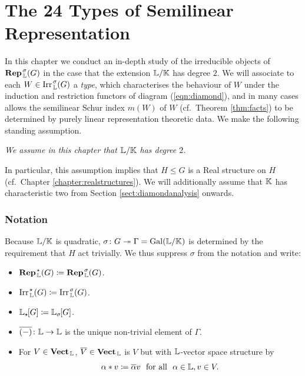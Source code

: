 \chapter{The 24 Types of Semilinear Representation}\label{chapter:twelvefoldway}

In this chapter we conduct an in-depth study of the irreducible objects of $\operatorname{\mathbf{Rep}}_{\, {\mathbb L}}^{\hspace{0.1em} \sigma}(G)$ in the case that the extension ${\mathbb L} / {\mathbb K}$ has degree $2$. We will associate to each $W \in \operatorname{Irr}_{\, {\mathbb L}}^{\hspace{0.1em} \sigma}(G)$ a \emph{type}, which characterises the behaviour of $W$ under the induction and restriction functors of diagram (\ref{eqn:diamond}), and in many cases allows the semilinear Schur index $m(W)$ of $W$ (cf.\ Theorem \ref{thm:facts}) to be determined by purely linear representation theoretic data. We make the following standing assumption.

\vspace{0.5em}
\begin{center}
\emph{We assume in this chapter that ${\mathbb L} / {\mathbb K}$ has degree $2$.}
\end{center}
\vspace{0.5em}

In particular, this assumption implies that $H \leq G$ is a Real structure on $H$ (cf.\ Chapter \ref{chapter:realstructures}). We will additionally assume that ${\mathbb K}$ has characteristic two from Section \ref{sect:diamondanalysis} onwards.
 
 \subsection{Notation}\label{sect:chap3notation} Because ${\mathbb L} / {\mathbb K}$ is quadratic, $\sigma \colon G \twoheadrightarrow \Gamma = \operatorname{Gal}({\mathbb L} / {\mathbb K})$ is determined by the requirement that $H$ act trivially. We thus suppress $\sigma$ from the notation and write:
 \begin{itemize}
    \item $\operatorname{\mathbf{Rep}}_{\, {\mathbb L}}^{\hspace{0.1em} \star}(G) \coloneqq \operatorname{\mathbf{Rep}}_{\, {\mathbb L}}^{\hspace{0.1em} \sigma}(G)$.
    \item $\operatorname{Irr}_{\, {\mathbb L}}^{\hspace{0.1em} \star}(G) \coloneqq \operatorname{Irr}_{\, {\mathbb L}}^{\hspace{0.1em} \sigma}(G)$.
    \item ${\mathbb L}_{\star \hspace{-0.1em}}[G] \coloneqq {\mathbb L}_{\sigma} \hspace{-0.1em}[G]$.
    \item $\overline{(-)} \colon {\mathbb L} \rightarrow {\mathbb L}$ is the unique non-trivial element of $\Gamma$.
    \item For $V \in \operatorname{\mathbf{Vect}}_{\, {\mathbb L}}$, $\overline{V} \in \operatorname{\mathbf{Vect}}_{\, {\mathbb L}}$ is $V$ but with ${\mathbb L}$-vector space structure by
    \[
    \alpha * v \coloneqq \overline{\alpha} v \ \mbox{  for all  } \ \alpha\in{\mathbb L} , v\in V.
    \]
 \end{itemize}

